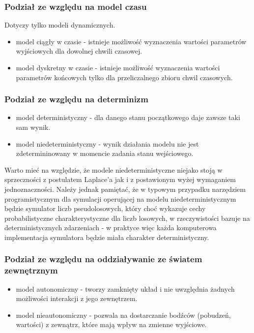 \subsubsection{Podział ze względu na model czasu}
\par{
Dotyczy tylko modeli dynamicznych.
\begin{itemize}
\item model ciągły w czasie - istnieje możliwość wyznaczenia wartości parametrów wyjściowych dla dowolnej chwili czasowej.
\item model dyskretny w czasie - istnieje możliwość wyznaczenia wartości parametrów końcowych tylko dla przeliczalnego zbioru chwil czasowych.
\end{itemize}
}

\subsubsection{Podział ze względu na determinizm}
\par{
\begin{itemize}
\item model deterministyczny - dla danego stanu początkowego daje zawsze taki sam wynik.
\item model niedeterministyczny - wynik działania modelu nie jest zdetermininowany w momencie zadania stanu wejściowego.
\end{itemize}
}
\par{
Warto mieć na względzie, że modele niedeterministyczne niejako stoją w sprzeczności z postulatem Laplace'a jak i z postawionym wyżej wymaganiem jednoznaczności. Należy jednak pamiętać, że w typowym przypadku narzędziem programistycznym dla symulacji operującej na modelu niedeterministycznym będzie symulator liczb pseudolosowych, który choć wykazuje cechy probabilistyczne charakterystyczne dla liczb losowych, w rzeczywistości bazuje na deterministycznych zdarzeniach - w praktyce więc każda komputerowa implementacja symulatora będzie miała charakter deterministyczny.
}

\subsubsection{Podział ze względu na oddziaływanie ze światem zewnętrznym}
\par{
\begin{itemize}
\item model autonomiczny - tworzy zamknięty układ i nie uwzględnia żadnych możliwości interakcji z jego zewnętrzem.
\item model nieautonomiczny - pozwala na dostarczanie bodźców (pobudzeń, wartości) z zewnątrz, które mają wpływ na zmienne wyjściowe.
\end{itemize}
}

